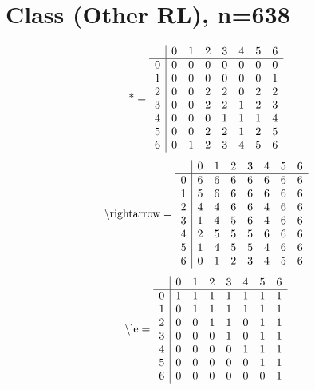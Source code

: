 \documentclass[11pt]{article}
\begin{document}
\section{Class (Other RL), n=638}
\[\text{*} = 
\begin{array}{r | r r r r r r r}
 & 0 & 1 & 2 & 3 & 4 & 5 & 6 \\ \hline
0 & 0 & 0 & 0 & 0 & 0 & 0 & 0 \\
1 & 0 & 0 & 0 & 0 & 0 & 0 & 1 \\
2 & 0 & 0 & 2 & 2 & 0 & 2 & 2 \\
3 & 0 & 0 & 2 & 2 & 1 & 2 & 3 \\
4 & 0 & 0 & 0 & 1 & 1 & 1 & 4 \\
5 & 0 & 0 & 2 & 2 & 1 & 2 & 5 \\
6 & 0 & 1 & 2 & 3 & 4 & 5 & 6 \\
\end{array}
\]
\[\text{\textbackslash rightarrow} = 
\begin{array}{r | r r r r r r r}
 & 0 & 1 & 2 & 3 & 4 & 5 & 6 \\ \hline
0 & 6 & 6 & 6 & 6 & 6 & 6 & 6 \\
1 & 5 & 6 & 6 & 6 & 6 & 6 & 6 \\
2 & 4 & 4 & 6 & 6 & 4 & 6 & 6 \\
3 & 1 & 4 & 5 & 6 & 4 & 6 & 6 \\
4 & 2 & 5 & 5 & 5 & 6 & 6 & 6 \\
5 & 1 & 4 & 5 & 5 & 4 & 6 & 6 \\
6 & 0 & 1 & 2 & 3 & 4 & 5 & 6 \\
\end{array}
\]
\[\text{\textbackslash le} = 
\begin{array}{r | r r r r r r r}
 & 0 & 1 & 2 & 3 & 4 & 5 & 6 \\ \hline
0 & 1 & 1 & 1 & 1 & 1 & 1 & 1 \\
1 & 0 & 1 & 1 & 1 & 1 & 1 & 1 \\
2 & 0 & 0 & 1 & 1 & 0 & 1 & 1 \\
3 & 0 & 0 & 0 & 1 & 0 & 1 & 1 \\
4 & 0 & 0 & 0 & 0 & 1 & 1 & 1 \\
5 & 0 & 0 & 0 & 0 & 0 & 1 & 1 \\
6 & 0 & 0 & 0 & 0 & 0 & 0 & 1 \\
\end{array}
\]
\end{document}
